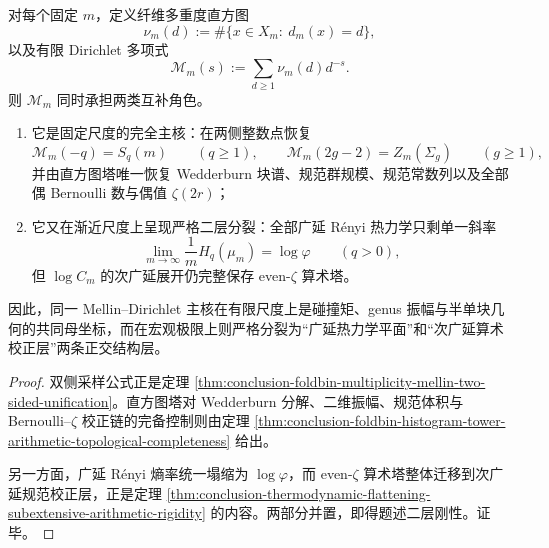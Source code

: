 \begin{theorem}\label{thm:conclusion-mellin-dirichlet-master-kernel-two-layer-rigidity}
对每个固定 \(m\)，定义纤维多重度直方图
\[
\nu_m(d):=\#\{x\in X_m:\ d_m(x)=d\},
\]
以及有限 Dirichlet 多项式
\[
\mathcal M_m(s):=\sum_{d\ge 1}\nu_m(d)d^{-s}.
\]
则 \(\mathcal M_m\) 同时承担两类互补角色。
\begin{enumerate}
  \item 它是固定尺度的完全主核：在两侧整数点恢复
  \[
  \mathcal M_m(-q)=S_q(m)\qquad(q\ge 1),
  \qquad
  \mathcal M_m(2g-2)=Z_m(\Sigma_g)\qquad(g\ge 1),
  \]
  并由直方图塔唯一恢复 Wedderburn 块谱、规范群规模、规范常数列以及全部偶 Bernoulli 数与偶值 \(\zeta(2r)\)；
  \item 它又在渐近尺度上呈现严格二层分裂：全部广延 R\'enyi 热力学只剩单一斜率
  \[
  \lim_{m\to\infty}\frac1m H_q(\mu_m)=\log\varphi
  \qquad(q>0),
  \]
  但 \(\log C_m\) 的次广延展开仍完整保存 even-\(\zeta\) 算术塔。
\end{enumerate}
因此，同一 Mellin--Dirichlet 主核在有限尺度上是碰撞矩、genus 振幅与半单块几何的共同母坐标，而在宏观极限上则严格分裂为“广延热力学平面”和“次广延算术校正层”两条正交结构层。
\end{theorem}
\begin{proof}
双侧采样公式正是定理 \ref{thm:conclusion-foldbin-multiplicity-mellin-two-sided-unification}。直方图塔对 Wedderburn 分解、二维振幅、规范体积与 Bernoulli--\(\zeta\) 校正链的完备控制则由定理 \ref{thm:conclusion-foldbin-histogram-tower-arithmetic-topological-completeness} 给出。

另一方面，广延 R\'enyi 熵率统一塌缩为 \(\log\varphi\)，而 even-\(\zeta\) 算术塔整体迁移到次广延规范校正层，正是定理 \ref{thm:conclusion-thermodynamic-flattening-subextensive-arithmetic-rigidity} 的内容。两部分并置，即得题述二层刚性。证毕。
\end{proof}

